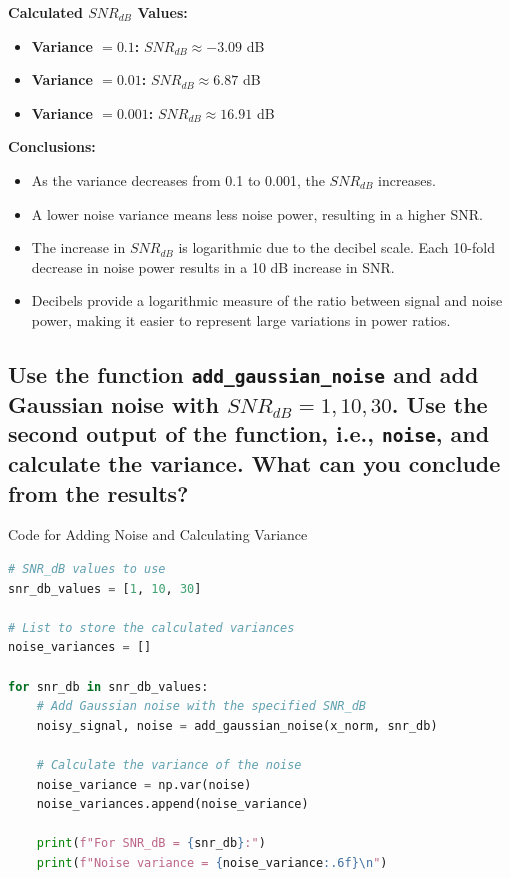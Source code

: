\documentclass[10pt]{article}
\theoremstyle{definition}
\theoremstyle{remark}
\theoremstyle{definition}
\numberwithin{equation}{prob}
\begin{document}
\textbf{Calculated \( SNR_{dB} \) Values:}

\begin{itemize}
    \item \textbf{Variance \( = 0.1 \):} \( SNR_{dB} \approx -3.09 \) dB
    \item \textbf{Variance \( = 0.01 \):} \( SNR_{dB} \approx 6.87 \) dB
    \item \textbf{Variance \( = 0.001 \):} \( SNR_{dB} \approx 16.91 \) dB
\end{itemize}

\textbf{Conclusions:}

\begin{itemize}
    \item As the variance decreases from 0.1 to 0.001, the \( SNR_{dB} \) increases.
    \item A lower noise variance means less noise power, resulting in a higher SNR.
    \item The increase in \( SNR_{dB} \) is logarithmic due to the decibel scale. Each 10-fold decrease in noise power results in a 10 dB increase in SNR.
    \item Decibels provide a logarithmic measure of the ratio between signal and noise power, making it easier to represent large variations in power ratios.
\end{itemize}

\subsection{Use the function \texttt{add\_gaussian\_noise} and add Gaussian noise with \( SNR_{dB} = 1, 10, 30 \). Use the second output of the function, i.e., \texttt{noise}, and calculate the variance. What can you conclude from the results?}

Code for Adding Noise and Calculating Variance

\begin{lstlisting}[language=Python]
# SNR_dB values to use
snr_db_values = [1, 10, 30]

# List to store the calculated variances
noise_variances = []

for snr_db in snr_db_values:
    # Add Gaussian noise with the specified SNR_dB
    noisy_signal, noise = add_gaussian_noise(x_norm, snr_db)
    
    # Calculate the variance of the noise
    noise_variance = np.var(noise)
    noise_variances.append(noise_variance)
    
    print(f"For SNR_dB = {snr_db}:")
    print(f"Noise variance = {noise_variance:.6f}\n")
\end{lstlisting}
\end{document}
